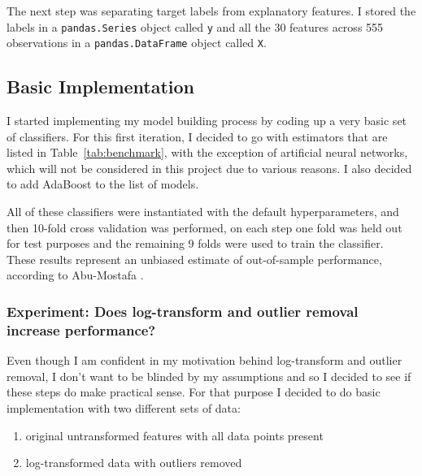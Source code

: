 \documentclass[10pt, a4paper]{article}
\begin{document}
The next step was separating target labels from explanatory features. I stored the labels in a \texttt{pandas.Series} object called \texttt{y} and all the 30 features across 555 observations in a \texttt{pandas.DataFrame} object called \texttt{X}.

\subsection{Basic Implementation}

I started implementing my model building process by coding up a very basic set of classifiers. For this first iteration, I decided to go with estimators that are listed in Table~\ref{tab:benchmark}, with the exception of artificial neural networks, which will not be considered in this project due to various reasons. I also decided to add AdaBoost to the list of models.

All of these classifiers were instantiated with the default hyperparameters, and then 10-fold cross validation was performed, on each step one fold was held out for test purposes and the remaining 9 folds were used to train the classifier. These results represent an unbiased estimate of out-of-sample performance, according to Abu-Mostafa \cite{abu-mostafa}.





\subsubsection{Experiment: Does log-transform and outlier removal increase performance?}

Even though I am confident in my motivation behind log-transform and outlier removal, I don't want to be blinded by my assumptions and so I decided to see if these steps do make practical sense. For that purpose I decided to do basic implementation with two different sets of data:
\begin{enumerate}
	\item original untransformed features with all data points present
	\item log-transformed data with outliers removed
\end{enumerate}
\end{document}
